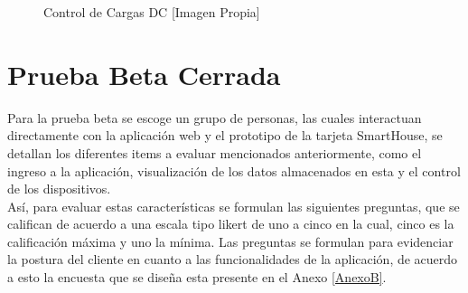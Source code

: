 \begin{figure}[H]
	\centering
	\caption{Control de Cargas DC [Imagen Propia]}
	\label{fig:DCc}
\end{figure}

\section{Prueba Beta Cerrada}

Para la prueba beta se escoge un grupo de personas, las cuales interactuan directamente con la aplicación web y el prototipo de la tarjeta SmartHouse, se detallan los diferentes items a evaluar mencionados anteriormente, como el ingreso a la aplicación, visualización de los datos almacenados en esta y el control de los dispositivos.\\

Así, para evaluar estas características se formulan las siguientes preguntas, que se califican de acuerdo a una escala tipo likert \cite{lik} de uno a cinco en la cual, cinco es la calificación máxima y uno la mínima. Las preguntas se formulan para evidenciar la postura del cliente en cuanto a las funcionalidades de la aplicación, de acuerdo a esto la encuesta que se diseña esta presente en el Anexo \ref{AnexoB}.

